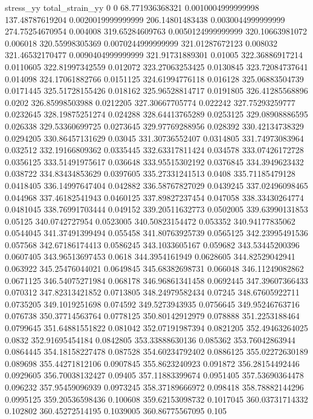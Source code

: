 stress_yy total_strain_yy
0 0
68.771936368321 0.0010004999999998
137.48787619204 0.0020019999999999
206.14801483438 0.0030044999999999
274.75254670954 0.004008
319.65284609763 0.0050124999999999
320.10663981072 0.006018
320.55998305369 0.0070244999999999
321.01287672123 0.008032
321.46532170477 0.0090404999999999
321.91731889301 0.01005
322.36886917214 0.0110605
322.81997342559 0.012072
323.27063253425 0.0130845
323.72084737641 0.014098
324.17061882766 0.0151125
324.61994776118 0.016128
325.06883504739 0.0171445
325.51728155426 0.018162
325.96528814717 0.0191805
326.41285568896 0.0202
326.85998503988 0.0212205
327.30667705774 0.022242
327.75293259777 0.0232645
328.19875251274 0.024288
328.64413765289 0.0253125
329.08908886595 0.026338
329.53360699725 0.0273645
329.97769288956 0.028392
330.42134738329 0.0294205
330.86457131629 0.03045
331.30736552407 0.0314805
331.74973083964 0.032512
332.19166809362 0.0335445
332.63317811424 0.034578
333.07426172728 0.0356125
333.51491975617 0.036648
333.95515302192 0.0376845
334.3949623432 0.038722
334.83434853629 0.0397605
335.27331241513 0.0408
335.71185479128 0.0418405
336.14997647404 0.042882
336.58767827029 0.0439245
337.02496098465 0.044968
337.46182541943 0.0460125
337.89827237454 0.047058
338.33430264774 0.0481045
338.76991703444 0.049152
339.20511632773 0.0502005
339.63990131853 0.05125
340.0742727954 0.0523005
340.50823154472 0.053352
340.94177835062 0.0544045
341.37491399494 0.055458
341.80763925739 0.0565125
342.23995491536 0.057568
342.67186174413 0.0586245
343.1033605167 0.059682
343.53445200396 0.0607405
343.96513697453 0.0618
344.3954161949 0.0628605
344.82529042941 0.063922
345.25476044021 0.0649845
345.68382698731 0.066048
346.11249082862 0.0671125
346.54075271984 0.068178
346.96861341458 0.0692445
347.39607366433 0.070312
347.82313421852 0.0713805
348.24979582434 0.07245
348.67605922711 0.0735205
349.1019251698 0.074592
349.5273943935 0.0756645
349.95246763716 0.076738
350.37714563764 0.0778125
350.80142912979 0.078888
351.2253188464 0.0799645
351.64881551822 0.081042
352.07191987394 0.0821205
352.49463264025 0.0832
352.91695454184 0.0842805
353.33888630136 0.085362
353.76042863944 0.0864445
354.18158227478 0.087528
354.60234792402 0.0886125
355.02272630189 0.089698
355.44271812106 0.0907845
355.8623240923 0.091872
356.28154492446 0.0929605
356.70038132427 0.09405
357.11883399674 0.0951405
357.53690364478 0.096232
357.95459096939 0.0973245
358.37189666972 0.098418
358.78882144296 0.0995125
359.20536598436 0.100608
359.62153098732 0.1017045
360.03731714332 0.102802
360.45272514195 0.1039005
360.86775567095 0.105
